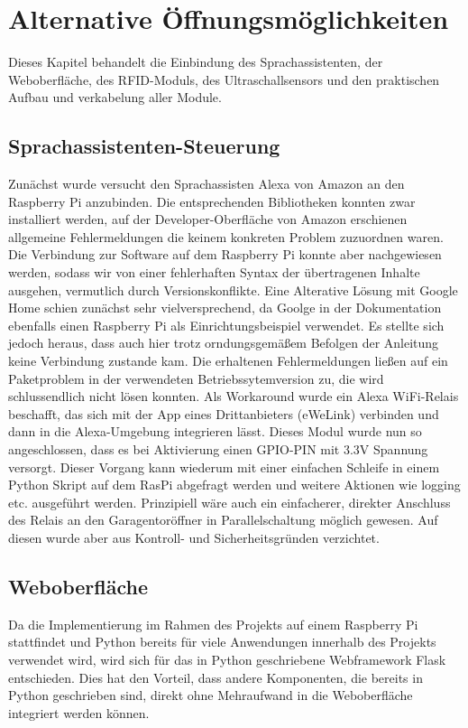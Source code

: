 \chapter{Alternative Öffnungsmöglichkeiten}
Dieses Kapitel behandelt die Einbindung des Sprachassistenten, der Weboberfläche, des RFID-Moduls, des Ultraschallsensors und den praktischen Aufbau und verkabelung aller Module.

\section{Sprachassistenten-Steuerung}
Zunächst wurde versucht den Sprachassisten Alexa von Amazon an den Raspberry Pi anzubinden. Die entsprechenden Bibliotheken konnten zwar installiert werden, auf der Developer-Oberfläche von Amazon erschienen allgemeine Fehlermeldungen die keinem konkreten Problem zuzuordnen waren. Die Verbindung zur Software auf dem Raspberry Pi konnte aber nachgewiesen werden, sodass wir von einer fehlerhaften Syntax der übertragenen Inhalte ausgehen, vermutlich durch Versionskonflikte.
Eine Alterative Lösung mit Google Home schien zunächst sehr vielversprechend, da Goolge in der Dokumentation ebenfalls einen Raspberry Pi als Einrichtungsbeispiel verwendet. Es stellte sich jedoch heraus, dass auch hier trotz orndungsgemäßem Befolgen der Anleitung keine Verbindung zustande kam. Die erhaltenen Fehlermeldungen ließen auf ein Paketproblem in der verwendeten Betriebssytemversion zu, die wird schlussendlich nicht lösen konnten. %
Als Workaround wurde ein Alexa WiFi-Relais beschafft, das sich mit der App eines Drittanbieters (eWeLink) verbinden und dann in die Alexa-Umgebung integrieren lässt. Dieses Modul wurde nun so angeschlossen, dass es bei Aktivierung einen \ac{GPIO}-PIN mit 3.3V Spannung versorgt. Dieser Vorgang kann wiederum mit einer einfachen Schleife in einem Python Skript auf dem RasPi abgefragt werden und weitere Aktionen wie logging etc. ausgeführt werden. Prinzipiell wäre auch ein einfacherer, direkter Anschluss des Relais an den Garagentoröffner in Parallelschaltung möglich gewesen. Auf diesen wurde aber aus Kontroll- und Sicherheitsgründen verzichtet.

\section{Weboberfläche}
Da die Implementierung im Rahmen des Projekts auf einem Raspberry Pi stattfindet und Python bereits für viele Anwendungen innerhalb des Projekts verwendet wird, wird sich für das in Python geschriebene Webframework Flask entschieden. Dies hat den Vorteil, dass andere Komponenten, die bereits in Python geschrieben sind, direkt ohne Mehraufwand in die Weboberfläche integriert werden können.

